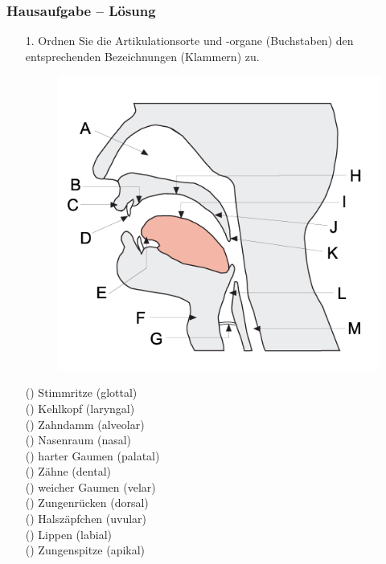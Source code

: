 
\begin{frame}
\frametitle{Hausaufgabe -- Lösung}
\begin{itemize}
	\item[1.] Ordnen Sie die Artikulationsorte und -organe (Buchstaben) den entsprechenden Bezeichnungen (Klammern) zu.
	
	\begin{minipage}{0.48\textwidth}
		\begin{figure}
			\centering
			\includegraphics[scale=0.33]{material/04phonoatonomy}
		\end{figure}
	\end{minipage}
	\hfill
	\begin{minipage}{0.4\textwidth}
		
		() Stimmritze (glottal)\\
		() Kehlkopf (laryngal)\\
		() Zahndamm (alveolar)\\
		() Nasenraum (nasal)\\
		() harter Gaumen (palatal)\\
		() Zähne (dental)\\
		() weicher Gaumen (velar)\\
		() Zungenrücken (dorsal)\\
		() Halszäpfchen (uvular)\\
		() Lippen (labial)\\
		() Zungenspitze (apikal)
	\end{minipage}
	
\end{itemize}
\end{frame}


